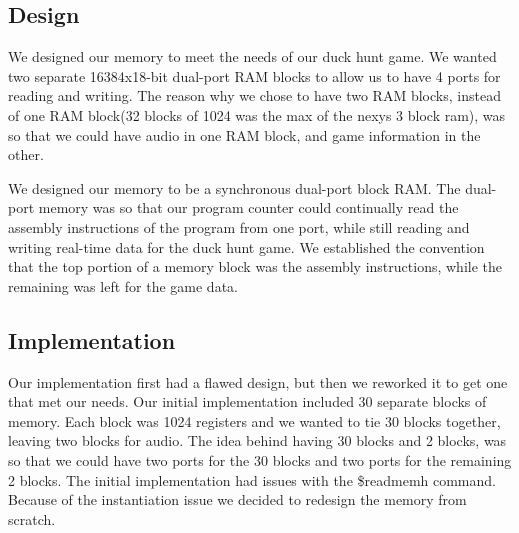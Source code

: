 \documentclass[letterpaper, 11 pt, conference]{article}
\begin{document}
\subsection{Design}
We designed our memory to meet the needs of our duck hunt game. We wanted two separate 16384x18-bit dual-port RAM blocks to allow us to have 4 ports for reading and writing. The reason why we chose to have two RAM blocks, instead of one RAM block(32 blocks of 1024 was the max of the nexys 3 block ram), was so that we could have audio in one RAM block, and game information in the other.
 
We designed our memory to be a synchronous dual-port block RAM. The dual-port memory was so that our program counter could continually read the assembly instructions of the program from one port, while still reading and writing real-time data for the duck hunt game. We established the convention that the top portion of a memory block was the assembly instructions, while the remaining was left for the game data.

\subsection{Implementation}
Our implementation first had a flawed design, but then we reworked it to get one that met our needs. Our initial implementation included 30 separate blocks of memory. Each block was 1024 registers and we wanted to tie 30 blocks together, leaving two blocks for audio.  The idea behind having 30 blocks and 2 blocks, was so that we could have two ports for the 30 blocks and two ports for the remaining 2 blocks. The initial implementation had issues with the \$readmemh command. Because of the instantiation issue we decided to redesign the memory from scratch.
 
\end{document}
